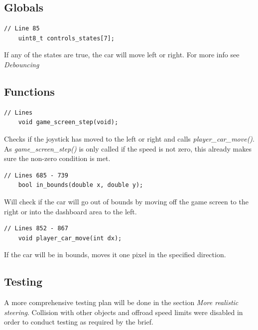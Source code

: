 \documentclass{article}
\begin{document}
\subsection*{Globals}
\begin{lstlisting}[style=CStyle]
	// Line 85
	uint8_t controls_states[7];
\end{lstlisting}
If any of the states are true, the car will move left or right. For more info see \emph{Debouncing}
\newline

\subsection*{Functions}
\begin{lstlisting}[style=CStyle]
	// Lines
	void game_screen_step(void);
\end{lstlisting}
Checks if the joystick has moved to the left or right and calls \emph{player\_car\_move()}. As \emph{game\_screen\_step()} is only called if the speed is not zero, this already makes sure the non-zero condition is met.
\begin{lstlisting}[style=CStyle]
	// Lines 685 - 739
	bool in_bounds(double x, double y);
\end{lstlisting}
Will check if the car will go out of bounds by moving off the game screen to the right or into the dashboard area to the left.
\begin{lstlisting}[style=CStyle]
	// Lines 852 - 867
	void player_car_move(int dx);
\end{lstlisting}
If the car will be in bounds, moves it one pixel in the specified direction.
\newline

\subsection*{Testing}
A more comprehensive testing plan will be done in the section \emph{More realistic steering}. Collision with other objects and offroad speed limits were disabled in order to conduct testing as required by the brief.
\end{document}
